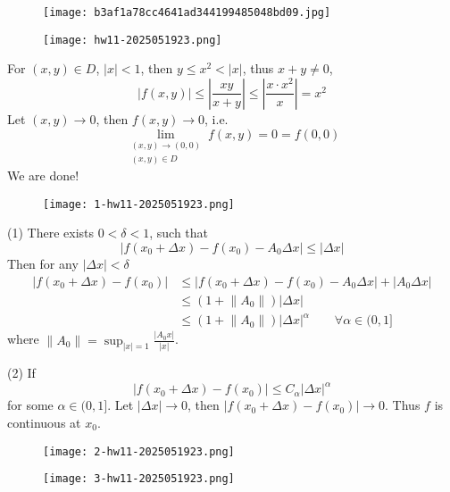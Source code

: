 \begin{figure}[H]
\centering
\texttt{[image: b3af1a78cc4641ad344199485048bd09.jpg]}
\label{}
\end{figure}

\begin{exercise}
\begin{figure}[H]
\centering
\texttt{[image: hw11-2025051923.png]}
\label{}
\end{figure}
\end{exercise}
For $(x, y)\in D$, $\lvert x \rvert<1$, then $y\leq x^2<\lvert x \rvert$, thus $x+y\neq0$,
\[
\lvert f(x,y) \rvert \leq \left\lvert  \frac{xy}{x+y}  \right\rvert \leq \left\lvert  \frac{x\cdot x^2}{x}  \right\rvert =x^2
\]
Let $(x,y)\to0$, then $f(x,y)\to0$, i.e.
\[
\lim_{\substack{(x,y) \to (0,0)\\(x,y)\in D} } f(x,y)=0=f(0,0)
\]
We are done!

\begin{exercise}
\begin{figure}[H]
\centering
\texttt{[image: 1-hw11-2025051923.png]}
\label{}
\end{figure}\label{e12f09}
\end{exercise}

(1)
There exists $0<\delta<1$, such that
\[
\lvert f(x_0+\Delta x)-f(x_0)-A_0\Delta x \rvert \leq \lvert \Delta x \rvert
\]
Then for any $\lvert \Delta x \rvert<\delta$
\[
\begin{aligned}
\lvert f(x_0+\Delta x)-f(x_0) \rvert  & \leq \lvert f(x_0+\Delta x)-f(x_0)-A_0\Delta x \rvert +\lvert A_0\Delta x \rvert  \\
 & \leq (1+\lVert A_0 \rVert )\lvert \Delta x \rvert  \\
 & \leq (1+\lVert A_0 \rVert )\lvert \Delta x \rvert ^{\alpha}\qquad \forall \alpha\in(0,1]
\end{aligned}
\]
where $\lVert A_0 \rVert=\sup_{\lvert x \rvert=1}\frac{\lvert A_0x \rvert}{\lvert x \rvert}$.

(2)
If
\[
\lvert f(x_0+\Delta x)-f(x_0) \rvert \leq C_{\alpha}\lvert \Delta x \rvert ^{\alpha}
\]
for some $\alpha\in(0,1]$. Let $\lvert \Delta x \rvert\to0$, then $\lvert f(x_0+\Delta x)-f(x_0) \rvert\to0$. Thus $f$ is continuous at $x_0$.

\begin{definition}[变分]
\begin{figure}[H]
\centering
\texttt{[image: 2-hw11-2025051923.png]}
\label{}
\end{figure}
\end{definition}
\begin{definition}[Holder 条件]
\begin{figure}[H]
\centering
\texttt{[image: 3-hw11-2025051923.png]}
\label{}
\end{figure}\label{ddc2af}
\end{definition}


